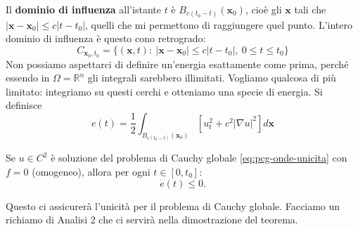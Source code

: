 \documentclass[10pt,a4paper,twoside,openright]{book}
\newcommand{\x}{\mathbf{x}}
\begin{document}
Il \textbf{dominio di influenza} all'istante $t$ è $B_{c( t_{0} -t)}(\x_{0})$, cioè gli $\x$ tali che $| \x -\x_{0}| \leqslant c| t-t_{0}| $, quelli che mi permettono di raggiungere quel punto. L'intero dominio di influenza è questo cono retrogrado:
\begin{equation}
	C_{\x_{0} ,t_{0}} =\{(\x ,t) :\ | \x -\x_{0}| \leqslant c| t-t_{0}| ,\ 0\leqslant t\leqslant t_{0}\}
\end{equation}
Non possiamo aspettarci di definire un'energia esattamente come prima, perché essendo in $\Omega =\mathbb{R}^{n}$ gli integrali sarebbero illimitati. Vogliamo qualcosa di più limitato: integriamo su questi cerchi e otteniamo una specie di energia. Si definisce
\begin{equation}
	e( t) =\frac{1}{2}\int _{B_{c( t_{0} -t)}(\x_{0})}\left[ u_{t}^{2} +c^{2}| \nabla u| ^{2}\right] d\x
	\label{eq:energia-onde-pcg}
\end{equation}
\begin{theorem}
	Se $u\in C^{2}$ è soluzione del problema di Cauchy globale \eqref{eq:pcg-onde-unicita} con $f=0$ (omogeneo), allora per ogni $t\in [ 0,t_{0}]$:
	\begin{equation}
		\dot{e}( t) \leqslant 0.
	\end{equation}
\end{theorem}
Questo ci assicurerà l'unicità per il problema di Cauchy globale.
Facciamo un richiamo di Analisi 2 che ci servirà nella dimostrazione del teorema.
\end{document}

